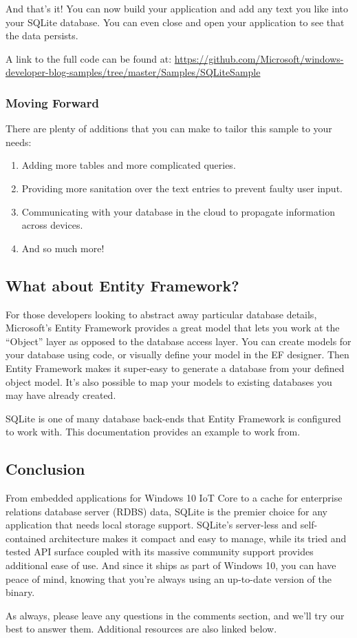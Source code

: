 And that’s it! You can now build your application and add any text you like into your SQLite database. You can even close and open your application to see that the data persists.

A link to the full code can be found at: \url{https://github.com/Microsoft/windows-developer-blog-samples/tree/master/Samples/SQLiteSample}

\subsubsection{Moving Forward}
There are plenty of additions that you can make to tailor this sample to your needs:
\begin{enumerate}
	\item Adding more tables and more complicated queries.
	\item Providing more sanitation over the text entries to prevent faulty user input.
	\item Communicating with your database in the cloud to propagate information across devices.
	\item And so much more!
\end{enumerate}

\subsection{What about Entity Framework?}

For those developers looking to abstract away particular database details, Microsoft’s Entity Framework provides a great model that lets you work at the “Object” layer as opposed to the database access layer. You can create models for your database using code, or visually define your model in the EF designer. Then Entity Framework makes it super-easy to generate a database from your defined object model. It’s also possible to map your models to existing databases you may have already created.

SQLite is one of many database back-ends that Entity Framework is configured to work with. This documentation provides an example to work from.

\subsection{Conclusion}
From embedded applications for Windows 10 IoT Core to a cache for enterprise relations database server (RDBS) data, SQLite is the premier choice for any application that needs local storage support. SQLite’s server-less and self-contained architecture makes it compact and easy to manage, while its tried and tested API surface coupled with its massive community support provides additional ease of use. And since it ships as part of Windows 10, you can have peace of mind, knowing that you’re always using an up-to-date version of the binary.

As always, please leave any questions in the comments section, and we’ll try our best to answer them. Additional resources are also linked below.

